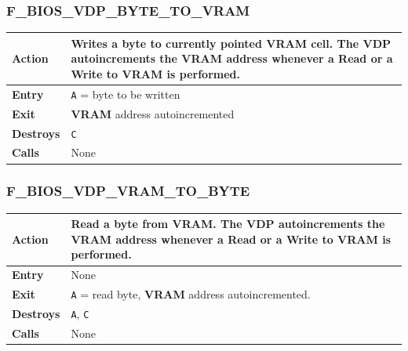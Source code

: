 \documentclass[a4paper,11pt]{article}
\begin{document}
        \subsubsection{F\_BIOS\_VDP\_BYTE\_TO\_VRAM}
        \label{func:fbiosvdpbytetovram}
        \begin{tabular}{l p{9cm}}
            \hline\textbf{Action}
            & Writes a byte to currently pointed \textbf{VRAM} cell. The 
            \textbf{VDP} autoincrements the \textbf{VRAM} address whenever a
            Read or a Write to \textbf{VRAM} is performed.\\
            \hline\textbf{Entry} & \texttt{A} = byte to be written\\
            \hline\textbf{Exit} & \textbf{VRAM} address autoincremented\\
            \hline\textbf{Destroys} & \texttt{C} \\
            \hline\textbf{Calls} & None\\
            \hline
        \end{tabular}

        \subsubsection{F\_BIOS\_VDP\_VRAM\_TO\_BYTE}
        \label{func:fbiosvdpvramtobyte}
        \begin{tabular}{l p{9cm}}
            \hline\textbf{Action}
            & Read a byte from \textbf{VRAM}. The \textbf{VDP} autoincrements
            the \textbf{VRAM} address whenever a Read or a Write to
            \textbf{VRAM} is performed.\\
            \hline\textbf{Entry} & None\\
            \hline\textbf{Exit} & \texttt{A} = read byte, \textbf{VRAM} address
            autoincremented.\\
            \hline\textbf{Destroys} & \texttt{A}, \texttt{C} \\
            \hline\textbf{Calls} & None\\
            \hline
        \end{tabular}
\end{document}

